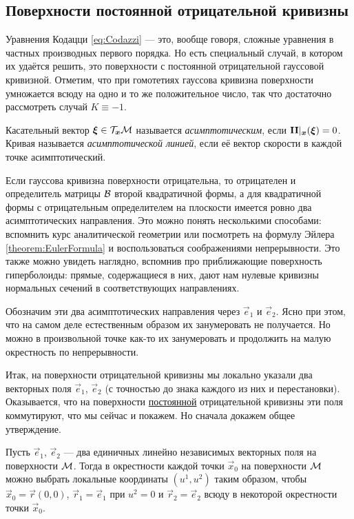 \subsection{Поверхности постоянной отрицательной кривизны}

Уравнения Кодацци \eqref{eq:Codazzi} --- это, вообще говоря, сложные уравнения в частных производных первого порядка. Но есть специальный случай, в котором их удаётся решить, это поверхности с постоянной отрицательной гауссовой кривизной. Отметим, что при гомотетиях гауссова кривизна поверхности умножается всюду на одно и то же положительное число, так что достаточно рассмотреть случай $K \equiv -1$.

\begin{definition}
	Касательный вектор $\boldsymbol{\xi} \in \mathcal{T}_{\boldsymbol{x}}\mathcal{M}$ называется \textit{асимптотическим}, если $\boldsymbol{\operatorname{II}}|_{\boldsymbol{x}}(\boldsymbol{\xi}) = 0$. Кривая называется \textit{асимптотической линией}, если её вектор скорости в каждой точке асимптотический.
\end{definition}

Если гауссова кривизна поверхности отрицательна, то отрицателен и определитель матрицы $\mathcal{B}$ второй квадратичной формы, а для квадратичной формы с отрицательным определителем на плоскости имеется ровно два асимптотических направления. Это можно понять несколькими способами: вспомнить курс аналитической геометрии или посмотреть на формулу Эйлера \ref{theorem:EulerFormula} и воспользоваться соображениями непрерывности. Это также можно увидеть наглядно, вспомнив про приближающие поверхность гиперболоиды: прямые, содержащиеся в них, дают нам нулевые кривизны нормальных сечений в соответствующих направлениях.

Обозначим эти два асимптотических направления через $\vec{e}_1$ и $\vec{e}_2$. Ясно при этом, что на самом деле естественным образом их занумеровать не получается. Но можно в произвольной точке как-то их занумеровать и продолжить на малую окрестность по непрерывности.

Итак, на поверхности отрицательной кривизны мы локально указали два векторных поля $\vec{e}_1$, $\vec{e}_2$ (с точностью до знака каждого из них и перестановки). Оказывается, что на поверхности \underline{постоянной} отрицательной кривизны эти поля коммутируют, что мы сейчас и покажем. Но сначала докажем общее утверждение.

\begin{lemma} \label{lemma:WeakBasis}
	Пусть $\vec{e}_1$, $\vec{e}_2$ --- два единичных линейно независимых векторных поля на поверхности $\mathcal{M}$. Тогда в окрестности каждой точки $\vec{x}_0$ на поверхности $\mathcal{M}$ можно выбрать локальные координаты $(u^1, u^2)$ таким образом, чтобы $\vec{x}_0 = \vec{r}(0, 0)$, $\vec{r}_1 = \vec{e}_1$ при $u^2 = 0$ и $\vec{r}_2 = \vec{e}_2$ всюду в некоторой окрестности точки $\vec{x}_0$.
\end{lemma}

